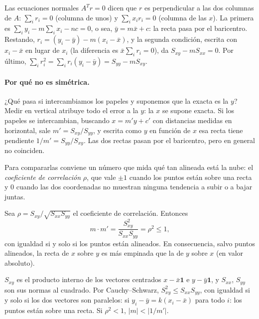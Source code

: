 \begin{demostracion}
Las ecuaciones normales \(A^Tr=0\) dicen que \(r\) es perpendicular a las dos columnas de
\(A\): \(\sum_ir_i=0\) (columna de unos) y \(\sum_ix_ir_i=0\) (columna de las \(x\)). La
primera es \(\sum_i y_i-m\sum_ix_i-nc=0\), o sea, \(\bar y=m\bar x+c\): la recta pasa por
el baricentro. Restando, \(r_i=(y_i-\bar y)-m(x_i-\bar x)\), y la segunda condición, escrita
con \(x_i-\bar x\) en lugar de \(x_i\) (la diferencia es \(\bar x\sum_ir_i=0\)), da
\(S_{xy}-mS_{xx}=0\). Por último,
\(\sum_ir_i^2=\sum_ir_i(y_i-\bar y)=S_{yy}-mS_{xy}\).
\end{demostracion}

\paragraph{Por qué no es simétrica.} ¿Qué pasa si intercambiamos los papeles y suponemos que
la exacta es la \(y\)? Medir en vertical atribuye todo el error a la \(y\): la \(x\) se
supone exacta. Si los papeles se intercambian, buscando \(x=m'y+c'\) con distancias medidas
en horizontal, sale \(m'=S_{xy}/S_{yy}\), y escrita como \(y\) en función de \(x\) esa recta
tiene pendiente \(1/m'=S_{yy}/S_{xy}\). Las dos rectas pasan por el baricentro, pero en
general no coinciden.

Para compararlas conviene un número que mida qué tan alineada está la nube: el
\emph{coeficiente de correlación} \(\rho\), que vale \(\pm1\) cuando los puntos están sobre una
recta y \(0\) cuando las dos coordenadas no muestran ninguna tendencia a subir o a bajar
juntas.

\begin{proposicion}\label{prop:cp-dos-regresiones}
Sea \(\rho=S_{xy}/\sqrt{S_{xx}S_{yy}}\) el coeficiente de correlación. Entonces
\[
  m\cdot m'=\frac{S_{xy}^2}{S_{xx}S_{yy}}=\rho^2\le1,
\]
con igualdad si y solo si los puntos están alineados. En consecuencia, salvo puntos
alineados, la recta de \(x\) sobre \(y\) es más empinada que la de \(y\) sobre \(x\) (en
valor absoluto).
\end{proposicion}

\begin{demostracion}
\(S_{xy}\) es el producto interno de los vectores centrados \(x-\bar x\mathbf 1\) e
\(y-\bar y\mathbf 1\), y \(S_{xx}\), \(S_{yy}\) son sus normas al cuadrado. Por
Cauchy--Schwarz, \(S_{xy}^2\le S_{xx}S_{yy}\), con igualdad si y solo si los dos vectores
son paralelos: si \(y_i-\bar y=k(x_i-\bar x)\) para todo \(i\): los puntos están
sobre una recta. Si \(\rho^2<1\), \(\lvert m\rvert<\lvert 1/m'\rvert\).
\end{demostracion}

